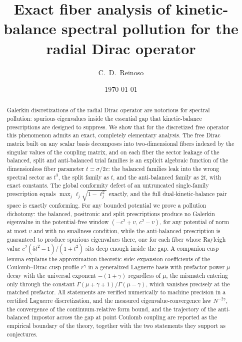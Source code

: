 \documentclass[11pt,reqno]{amsart}
\theoremstyle{definition}
\theoremstyle{remark}
\begin{document}
\title[Exact fiber analysis of kinetic-balance pollution]{Exact fiber
analysis of kinetic-balance spectral pollution for the radial Dirac
operator}

\author{C.~D.~Reinoso}
\address{Facultad de Ciencias, Escuela Superior Polit\'ecnica de
Chimborazo (ESPOCH), Riobamba, Ecuador}

\date{\today}

\begin{abstract}
Galerkin discretizations of the radial Dirac operator are notorious for
spectral pollution: spurious eigenvalues inside the essential gap that
kinetic-balance prescriptions are designed to suppress. We show that for
the discretized free operator this phenomenon admits an exact,
completely elementary analysis. The free Dirac matrix built on any
scalar basis decomposes into two-dimensional fibers indexed by the
singular values of the coupling matrix, and on each fiber the sector
leakage of the balanced, split and anti-balanced trial families is an
explicit algebraic function of the dimensionless fiber parameter
$t=\sigma/2c$: the balanced families leak into the wrong spectral sector
as $t^{3}$, the split family as $t$, and the anti-balanced family as
$2t$, with exact constants. The global conformity defect of an
untruncated single-family prescription equals
$\max_{j}\ell_{j}\sqrt{1-\ell_{j}^{2}}$ exactly, and the full
dual-kinetic-balance pair space is exactly conforming. For any bounded
potential we prove a pollution dichotomy: the balanced, positronic and
split prescriptions produce no Galerkin eigenvalue in the
potential-free window $(-c^{2}+v,\,c^{2}-v)$, for any potential of norm
at most $v$ and with no smallness condition, while the anti-balanced
prescription is guaranteed to produce spurious eigenvalues there, one
for each fiber whose Rayleigh value $c^{2}(5t^{2}-1)/(1+t^{2})$ sits
deep enough inside the gap. A companion cusp lemma explains the
approximation-theoretic side: expansion coefficients of the
Coulomb--Dirac cusp profile $r^{\gamma}$ in a generalized Laguerre basis
with prefactor power $\mu$ decay with the universal exponent
$-(1+\gamma)$ regardless of $\mu$, the mismatch entering only through
the constant $\Gamma(\mu+\gamma+1)/\Gamma(\mu-\gamma)$, which vanishes
precisely at the matched prefactor. All statements are verified
numerically to machine precision in a certified Laguerre discretization,
and the measured eigenvalue-convergence law $N^{-2\gamma}$, the
convergence of the continuum-relative form bound, and the trajectory of
the anti-balanced impostor across the gap at point Coulomb coupling are
reported as the empirical boundary of the theory, together with the two
statements they support as conjectures.
\end{abstract}
\end{document}
